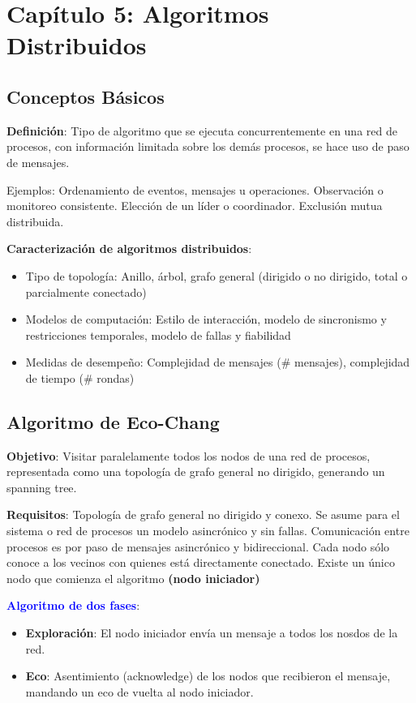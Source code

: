 \section{Capítulo 5: Algoritmos Distribuidos}
\subsection{Conceptos Básicos}

\textbf{Definición}: Tipo de algoritmo que se ejecuta concurrentemente en una red de procesos, con información limitada sobre los demás procesos, se hace uso de paso de mensajes.

Ejemplos: Ordenamiento de eventos, mensajes u operaciones. Observación o monitoreo consistente. Elección de un líder o coordinador. Exclusión mutua distribuida.

\textbf{Caracterización de algoritmos distribuidos}: \begin{itemize}
    \item Tipo de topología: Anillo, árbol, grafo general (dirigido o no dirigido, total o parcialmente conectado)
    \item Modelos de computación: Estilo de interacción, modelo de sincronismo y restricciones temporales, modelo de fallas y fiabilidad
    \item Medidas de desempeño: Complejidad de mensajes (\# mensajes), complejidad de tiempo (\# rondas)

\end{itemize}

\subsection{Algoritmo de Eco-Chang}

\textbf{Objetivo}: Visitar paralelamente todos los nodos de una red de procesos, representada como una topología de grafo general no dirigido, generando un spanning tree.

\textbf{Requisitos}: Topología de grafo general no dirigido y conexo. Se asume para el sistema o red de procesos un modelo asincrónico y sin fallas. Comunicación entre procesos es por paso de mensajes asincrónico y bidireccional. Cada nodo sólo conoce a los vecinos con quienes está directamente conectado. Existe un único nodo que comienza el algoritmo \textbf{(nodo iniciador)}

\textbf{\textcolor{blue}{Algoritmo de dos fases}}: \begin{itemize}
    \item \textbf{Exploración}: El nodo iniciador envía un mensaje a todos los nosdos de la red.
    \item \textbf{Eco}: Asentimiento (acknowledge) de los nodos que recibieron el mensaje, mandando un eco de vuelta al nodo iniciador.
\end{itemize}

